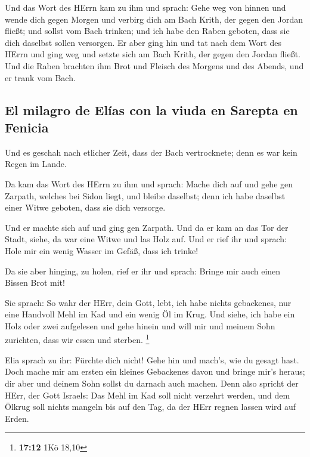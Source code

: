  Und das Wort des HErrn kam zu ihm und sprach:
 Gehe weg von hinnen und wende dich gegen Morgen und
verbirg dich am Bach Krith, der gegen den Jordan fließt; 
und sollst vom Bach trinken; und ich habe den Raben geboten, dass sie
dich daselbst sollen versorgen.  Er aber ging hin und tat
nach dem Wort des HErrn und ging weg und setzte sich am Bach Krith, der
gegen den Jordan fließt.  Und die Raben brachten ihm Brot
und Fleisch des Morgens und des Abends, und er trank vom Bach.

\hypertarget{el-milagro-de-eluxedas-con-la-viuda-en-sarepta-en-fenicia}{%
\subsection{El milagro de Elías con la viuda en Sarepta en
Fenicia}\label{el-milagro-de-eluxedas-con-la-viuda-en-sarepta-en-fenicia}}

 Und es geschah nach etlicher Zeit, dass der Bach
vertrocknete; denn es war kein Regen im Lande.

 Da kam das Wort des HErrn zu ihm und sprach:
 Mache dich auf und gehe gen Zarpath, welches bei Sidon
liegt, und bleibe daselbst; denn ich habe daselbst einer Witwe geboten,
dass sie dich versorge.

 Und er machte sich auf und ging gen Zarpath. Und da er
kam an das Tor der Stadt, siehe, da war eine Witwe und las Holz auf. Und
er rief ihr und sprach: Hole mir ein wenig Wasser im Gefäß, dass ich
trinke!

 Da sie aber hinging, zu holen, rief er ihr und sprach:
Bringe mir auch einen Bissen Brot mit!

 Sie sprach: So wahr der HErr, dein Gott, lebt, ich habe
nichts gebackenes, nur eine Handvoll Mehl im Kad und ein wenig Öl im
Krug. Und siehe, ich habe ein Holz oder zwei aufgelesen und gehe hinein
und will mir und meinem Sohn zurichten, dass wir essen und sterben.
\footnote{\textbf{17:12} 1Kö 18,10}

 Elia sprach zu ihr: Fürchte dich nicht! Gehe hin und
mach's, wie du gesagt hast. Doch mache mir am ersten ein kleines
Gebackenes davon und bringe mir's heraus; dir aber und deinem Sohn
sollst du darnach auch machen.  Denn also spricht der
HErr, der Gott Israels: Das Mehl im Kad soll nicht verzehrt werden, und
dem Ölkrug soll nichts mangeln bis auf den Tag, da der HErr regnen
lassen wird auf Erden.

